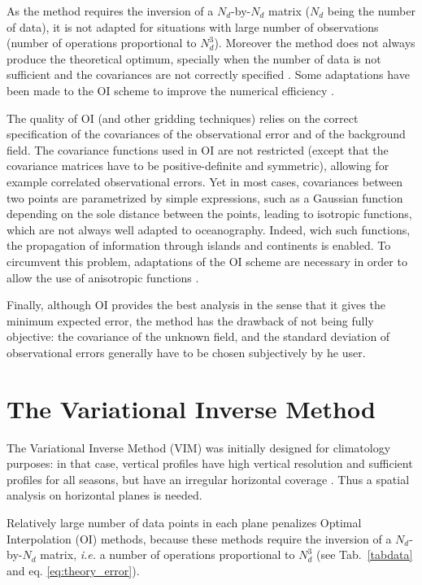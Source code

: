 As the method requires the inversion of a $N_{d}$-by-$N_{d}$ matrix ($N_{d}$ being the number of data), it is not adapted for situations with large number of observations (number of operations proportional to $N_{d}^{3}$). Moreover the method does not always produce the theoretical optimum, specially when the number of data is not sufficient and the covariances are not correctly specified \citep[e.g.,][]{RIXEN00,GOMIS01}. Some adaptations have been made to the OI scheme to improve the numerical efficiency \citep[e.g.,][]{HARTMAN08,ZHANG10}.

The quality of OI (and other gridding techniques) relies on the correct specification of the covariances of the observational error and of the background field. The covariance functions used in OI are not restricted (except that the covariance matrices have to be positive-definite and symmetric), allowing for example correlated observational errors. Yet in most cases, covariances between two points are parametrized by simple expressions, such as a Gaussian function depending on the sole distance between the points, leading to isotropic functions, which are not always well adapted to oceanography. Indeed, wich such functions, the propagation of information through islands and continents is enabled. To circumvent this problem, adaptations of the OI scheme are necessary in order to allow the use of anisotropic functions \citep[e.g.,][]{TANDEO11}.

Finally, although OI provides the best analysis in the sense that it gives the minimum expected error, the method has the drawback of not being fully objective: the covariance of the unknown field, and the standard deviation of observational errors generally have to be chosen subjectively by he user.

\section[VIM and its implementation]{The Variational Inverse Method}

The Variational Inverse Method (VIM) was initially designed for climatology purposes: in that case, vertical profiles have high vertical resolution and sufficient profiles for all seasons, but have an irregular horizontal coverage \citep{BRASSEUR96}. Thus a spatial analysis on horizontal planes is needed. 

Relatively large number of data points in each plane penalizes Optimal Interpolation (OI) methods, because these methods require the inversion of a $N_{d}$-by-$N_{d}$ matrix, \textit{i.e.} a number of operations proportional to $N_{d}^{3}$ (see Tab.~\ref{tabdata} and eq. \ref{eq:theory_error}).


